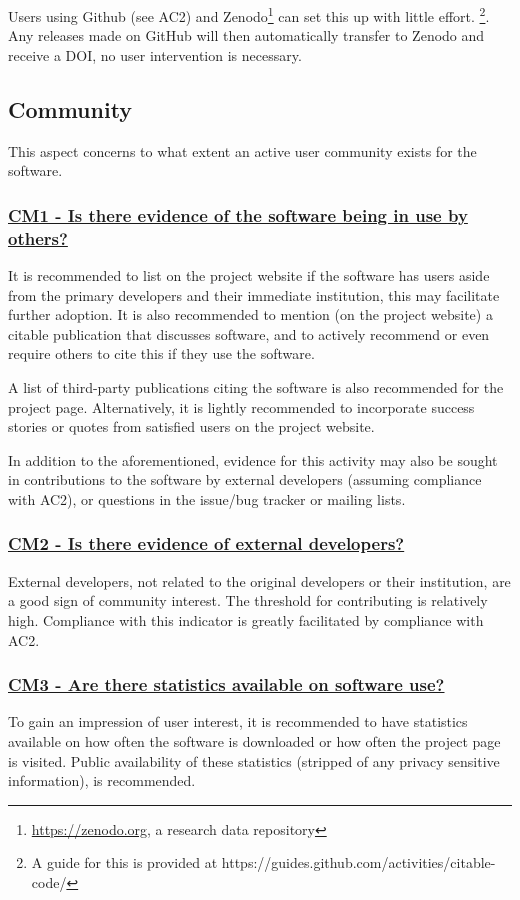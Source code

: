 \documentclass[a4paper,11pt]{article}
\newcommand{\indicator}[1]{\subsubsection*{\underline{#1}}}
\begin{document}
Users using Github (see AC2) and Zenodo\footnote{\url{https://zenodo.org}, a
research data repository} can set this up with little effort. \footnote{A guide
for this is provided at https://guides.github.com/activities/citable-code/}.
Any releases made on GitHub will then automatically transfer to Zenodo and
receive a DOI, no user intervention is necessary. 

\subsection{Community}

This aspect concerns to what extent an active user community exists for the
software.

\indicator{CM1 - Is there evidence of the software being in use by others?}

It is recommended to list on the project website if the software has 
users aside from the primary developers and their immediate institution, this
may facilitate further adoption. It is also recommended to mention (on the
project website) a citable publication that discusses software, and to actively
recommend or even require others to cite this if they use the software.

A list of third-party publications citing the software is also recommended for
the project page. Alternatively, it is lightly recommended to
incorporate success stories or quotes from satisfied users on the project
website.

In addition to the aforementioned, evidence for this activity may also be sought
in contributions to the software by external developers (assuming
compliance with AC2), or questions in the issue/bug tracker or mailing lists.

\indicator{CM2 - Is there evidence of external developers?}

External developers, not related to the original developers or their
institution, are a good sign of community interest. The threshold for
contributing is relatively high. Compliance with this indicator is greatly
facilitated by compliance with AC2.

\indicator{CM3 - Are there statistics available on software use?}

To gain an impression of user interest, it is recommended to have statistics
available on how often the software is downloaded or how often the project page
is visited. Public availability of these statistics (stripped of any privacy
sensitive information), is recommended.
\end{document}
